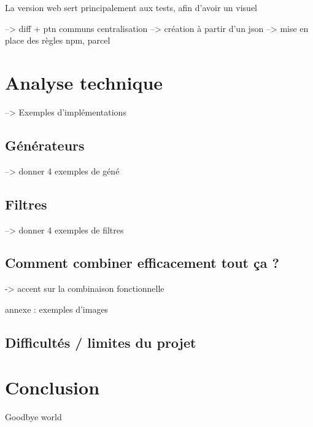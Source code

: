 \documentclass{article}
\begin{document}
La version web sert principalement aux tests, afin d'avoir un visuel

--> diff + ptn communs centralisation 
--> création à partir d'un json
--> mise en place des règles npm, parcel


\section{Analyse technique}
--> Exemples d'implémentations

\subsection{Générateurs}
--> donner 4 exemples de géné

\subsection{Filtres}
--> donner 4 exemples de filtres

\subsection{Comment combiner efficacement tout ça ?}
-> accent sur la combinaison fonctionnelle

annexe : exemples d'images

\subsection{Difficultés / limites du projet}

\section*{Conclusion}
Goodbye world
\end{document}
